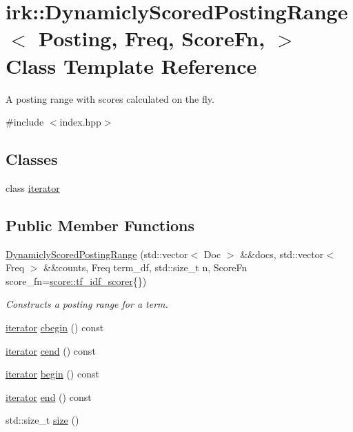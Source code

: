 \hypertarget{classirk_1_1DynamiclyScoredPostingRange}{}\section{irk\+:\+:Dynamicly\+Scored\+Posting\+Range$<$ Posting, Freq, Score\+Fn, $>$ Class Template Reference}
\label{classirk_1_1DynamiclyScoredPostingRange}


A posting range with scores calculated on the fly.  




{\ttfamily \#include $<$index.\+hpp$>$}

\subsection*{Classes}
\begin{DoxyCompactItemize}
\item 
class \mbox{\hyperlink{classirk_1_1DynamiclyScoredPostingRange_1_1iterator}{iterator}}
\end{DoxyCompactItemize}
\subsection*{Public Member Functions}
\begin{DoxyCompactItemize}
\item 
\mbox{\hyperlink{classirk_1_1DynamiclyScoredPostingRange_abad4cca22012d95af138b66e9988f4e5}{Dynamicly\+Scored\+Posting\+Range}} (std\+::vector$<$ Doc $>$ \&\&docs, std\+::vector$<$ Freq $>$ \&\&counts, Freq term\+\_\+df, std\+::size\+\_\+t n, Score\+Fn score\+\_\+fn=\mbox{\hyperlink{structirk_1_1score_1_1tf__idf__scorer}{score\+::tf\+\_\+idf\+\_\+scorer}}\{\})
\begin{DoxyCompactList}\small\item\em Constructs a posting range for a term. \end{DoxyCompactList}\item 
\mbox{\hyperlink{classirk_1_1DynamiclyScoredPostingRange_1_1iterator}{iterator}} \mbox{\hyperlink{classirk_1_1DynamiclyScoredPostingRange_a130e87da0cf848b265a5b3a02757a912}{cbegin}} () const
\item 
\mbox{\hyperlink{classirk_1_1DynamiclyScoredPostingRange_1_1iterator}{iterator}} \mbox{\hyperlink{classirk_1_1DynamiclyScoredPostingRange_ad089ed399066946c119434893ba6f5c3}{cend}} () const
\item 
\mbox{\hyperlink{classirk_1_1DynamiclyScoredPostingRange_1_1iterator}{iterator}} \mbox{\hyperlink{classirk_1_1DynamiclyScoredPostingRange_a4861c07518767929584ca27b38282a58}{begin}} () const
\item 
\mbox{\hyperlink{classirk_1_1DynamiclyScoredPostingRange_1_1iterator}{iterator}} \mbox{\hyperlink{classirk_1_1DynamiclyScoredPostingRange_ab06998cf9db3dab95fa521815c0c1e1a}{end}} () const
\item 
std\+::size\+\_\+t \mbox{\hyperlink{classirk_1_1DynamiclyScoredPostingRange_abbe4a0bacd2619a9ad5c00b0e6851a97}{size}} ()
\end{DoxyCompactItemize}


